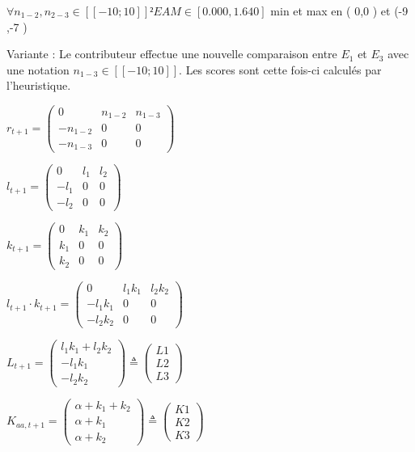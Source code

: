 $\forall{n_{1-2},n_{2-3}}\in [\![-10;10]\!]²  EAM \in [ 0.000,1.640 ]$ 
min et max en ( 0,0 ) et  (-9 ,-7 )








Variante : 
Le contributeur effectue une nouvelle comparaison entre $E_{1}$ et $E_{3}$ avec une notation $n_{1-3} \in [\![-10;10]\!]$. Les scores sont cette fois-ci calculés par l'heuristique.

$r_{t+1}= \begin{pmatrix}
0 & n_{1-2} &  n_{1-3} \\
-n_{1-2} & 0 & 0\\
 -n_{1-3}  & 0 & 0
\end{pmatrix}$

$l_{t+1}= \begin{pmatrix}
0 & l_1 & l_2\\
-l_1 & 0 & 0\\
-l_2 & 0 & 0
\end{pmatrix}
$

$k_{t+1}= \begin{pmatrix}
0 & k_1 &  k_2 \\
k_1 & 0 & 0 \\
 k_2 & 0 & 0
\end{pmatrix}
$


$l_{t+1} \cdot k_{t+1}= \begin{pmatrix}
0 & l_1 k_1 & l_2 k_2\\
-l_1 k_1 & 0 & 0\\
-l_2 k_2 & 0 & 0
\end{pmatrix}
$

$L_{t+1}= \begin{pmatrix}
l_1 k_1 +l_2 k_2 \\
-l_1 k_1\\
-l_2 k_2
\end{pmatrix} \triangleq
\begin{pmatrix}
L1\\
L2\\
L3
\end{pmatrix} 
$

$K_{aa,t+1}= \begin{pmatrix}
\alpha + k_1 + k_2\\
\alpha +  k_1 \\
\alpha + k_2
\end{pmatrix} \triangleq
\begin{pmatrix}
K1\\
K2\\
K3
\end{pmatrix} 
$



